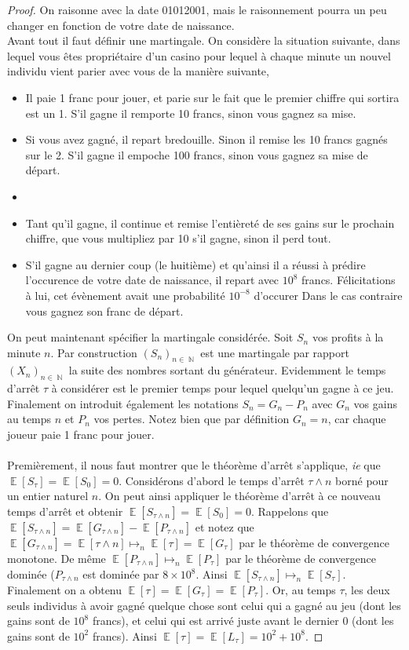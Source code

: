 \documentclass{article}
\theoremstyle{definition}
\numberwithin{equation}{section}
\DeclareMathOperator{\N}{\mathbb{N}}
\DeclareMathOperator{\E}{\mathbb{E}}
\begin{document}
\begin{proof}
On raisonne avec la date 01012001, mais le raisonnement pourra un peu changer en fonction de votre date de naissance.\\
Avant tout il faut définir une martingale. On considère la situation suivante, dans lequel vous êtes propriétaire d'un casino pour lequel à chaque minute un nouvel individu vient parier avec vous de la manière suivante,
\begin{itemize}
\item[$\bullet$] Il paie 1 franc pour jouer, et parie sur le fait que le premier chiffre qui sortira est un 1. S'il gagne il remporte 10 francs, sinon vous gagnez sa mise.
\item[$\bullet$] Si vous avez gagné, il repart bredouille. Sinon il remise les 10 francs gagnés sur le 2. S'il gagne il empoche 100 francs, sinon vous gagnez sa mise de départ.
\item[$\dots$]
\item[$\bullet$] Tant qu'il gagne, il continue et remise l'entièreté de ses gains sur le prochain chiffre, que vous multipliez par 10 s'il gagne, sinon il perd tout.
\item[$\bullet$] S'il gagne au dernier coup (le huitième) et qu'ainsi il a réussi à prédire l'occurence de votre date de naissance, il repart avec $10^8$ francs. Félicitations à lui, cet évènement avait une probabilité $10^{-8}$ d'occurer Dans le cas contraire vous gagnez son franc de départ.
\end{itemize}
On peut maintenant spécifier la martingale considérée. Soit $S_n$ vos profits à la minute $n$. Par construction $(S_n)_{n\in\N}$ est une martingale par rapport $ (X_n)_{n\in\N}$ la suite des nombres sortant du générateur. Evidemment le temps d'arrêt $\tau$ à considérer est le premier temps pour lequel quelqu'un gagne à ce jeu. Finalement on introduit également les notations $S_n = G_n - P_n$ avec $G_n$ vos gains au temps $n$ et $P_n$ vos pertes. Notez bien que par définition $G_n=n$, car chaque joueur paie 1 franc pour jouer.\\
~\\
Premièrement, il nous faut montrer que le théorème d'arrêt s'applique, \textit{ie} que $\E[S_\tau]=\E[S_0]=0$. Considérons d'abord le temps d'arrêt $\tau\wedge n$ borné pour un entier naturel $n$. On peut ainsi appliquer le théorème d'arrêt à ce nouveau temps d'arrêt et obtenir $\E[S_{\tau\wedge n}]=\E[S_0]=0$. Rappelons que $\E[S_{\tau\wedge n}]=\E[G_{\tau\wedge n}]-\E[P_{\tau\wedge n}]$ et notez que $\E[G_{\tau\wedge n}] = \E[\tau\wedge n] \mapsto_n \E[\tau] = \E[G_\tau]$ par le théorème de convergence monotone. De même $\E[P_{\tau\wedge n}]\mapsto_n \E[P_\tau]$ par le théorème de convergence dominée ($P_{\tau\wedge n}$ est dominée par $8\times 10^8$. Ainsi $\E[S_{\tau\wedge n}]\mapsto_n\E[S_\tau]$.\\
Finalement on a obtenu $\E[\tau]=\E[G_\tau]=\E[P_\tau]$. Or, au temps $\tau$, les deux seuls individus à avoir gagné quelque chose sont celui qui a gagné au jeu (dont les gains sont de $10^8$ francs), et celui qui est arrivé juste avant le dernier 0 (dont les gains sont de $10^2$ francs). Ainsi $\E[\tau]=\E[L_\tau]=10^2+10^8$.
\end{proof}
\end{document}
